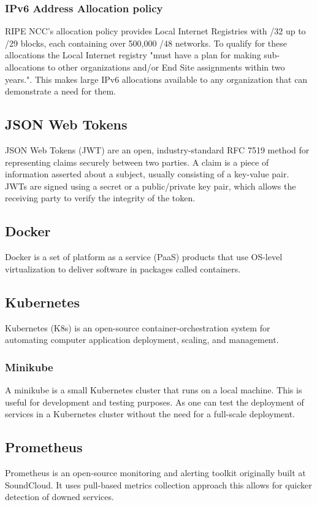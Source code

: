 \documentclass[12pt]{article}
\begin{document}
\subsubsection{IPv6 Address Allocation policy}
RIPE NCC's allocation policy provides Local Internet Registries with /32 up to /29 blocks, each containing over 500,000 /48 networks.
To qualify for these allocations the Local Internet registry 
"must have a plan for making sub-allocations to other organizations and/or End Site assignments within two years."\cite{IPv6AddressAllocation}.
This makes large IPv6 allocations available to any organization that can demonstrate a need for them.

\subsection{JSON Web Tokens}
JSON Web Tokens (JWT)\cite{jonesJSONWebToken2015} are an open, industry-standard RFC 7519 method for representing claims securely between two parties.
A claim is a piece of information asserted about a subject, usually consisting of a key-value pair.
JWTs are signed using a secret or a public/private key pair, which allows the receiving party to verify the integrity of the token.

\subsection{Docker}
Docker\cite{DockerAcceleratedContainer2022} is a set of platform as a service (PaaS) products that use OS-level virtualization to deliver software in packages called containers.

\subsection{Kubernetes}
Kubernetes (K8s)\cite{ProductionGradeContainerOrchestration} is an open-source container-orchestration system for automating computer application deployment, scaling, and management.

\subsubsection{Minikube}
A minikube is a small Kubernetes cluster that runs on a local machine. This is useful for development and testing purposes.
As one can test the deployment of services in a Kubernetes cluster without the need for a full-scale deployment.

\subsection{Prometheus}
Prometheus is an open-source monitoring and alerting toolkit originally built at SoundCloud.
It uses pull-based metrics collection approach this allows for quicker detection of downed services.
\end{document}
